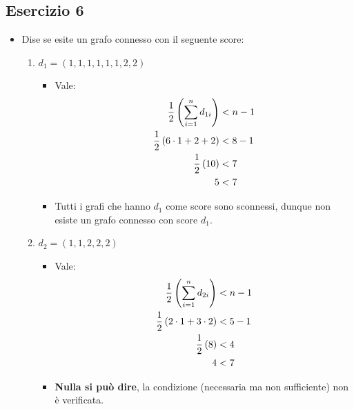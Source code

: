 \documentclass[10pt]{article}
\begin{document}
	\subsection{Esercizio 6}
	\begin{itemize}
	\item
	Dise se esite un grafo connesso con il seguente score:
	\begin{enumerate}
	\item
	$d_1 = (1,1,1,1,1,1,2,2)$
	\begin{itemize}
	\item
	Vale:
	\begin{equation}
	\begin{split}
	\frac{1}{2} \left(\sum_{i = 1}^{n} d_{1i} \right) &< n - 1 \\
	\frac{1}{2} \left(6 \cdot 1 + 2 + 2\right) &< 8 - 1 \\
	\frac{1}{2} \left(10\right) &< 7 \\
	5 &< 7
	\notag
	\end{split}
	\end{equation}
	\item
	Tutti i grafi che hanno $d_1$ come score sono sconnessi, dunque non esiste un grafo connesso con score $d_1$.
	\end{itemize}
	\item
	$d_2 = (1,1,2,2,2)$
	\begin{itemize}
	\item
	Vale:
	\begin{equation}
	\begin{split}
	\frac{1}{2} \left(\sum_{i = 1}^{n} d_{2i} \right) &< n - 1 \\
	\frac{1}{2} \left(2 \cdot 1 + 3 \cdot  2\right) &< 5 - 1 \\
	\frac{1}{2} \left(8\right) &< 4 \\
	4 &< 7
	\notag
	\end{split}
	\end{equation}
	\item
	\textbf{Nulla si può dire}, la condizione (necessaria ma non sufficiente) non è verificata.
	\end{itemize}
	\end{enumerate}
	\end{itemize}
\end{document}
